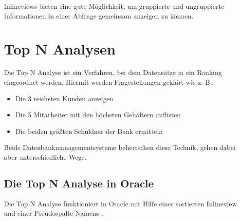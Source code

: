       \begin{merke}
        Inlineviews bieten eine gute Möglichkeit, um gruppierte und ungruppierte Informationen in einer Abfrage gemeinsam anzeigen zu können.
      \end{merke}
    \section{Top N Analysen}
      Die Top N Analyse ist ein Verfahren, bei dem Datensätze in ein Ranking eingeordnet werden. Hiermit werden Fragestellungen geklärt wie z. B.:
      \begin{itemize}
        \item Die 3 reichsten Kunden anzeigen
        \item Die 5 Mitarbeiter mit den höchsten Gehältern auflisten
        \item Die beiden größten Schuldner der Bank ermitteln
      \end{itemize}
      Beide Datenbankmanagementsysteme beherrschen diese Technik, gehen dabei aber unterschiedliche Wege.
      \subsection{Die Top N Analyse in Oracle}
        Die Top N Analyse funktioniert in Oracle mit Hilfe einer sortierten Inlineview und einer Pseudospalte Namens .
